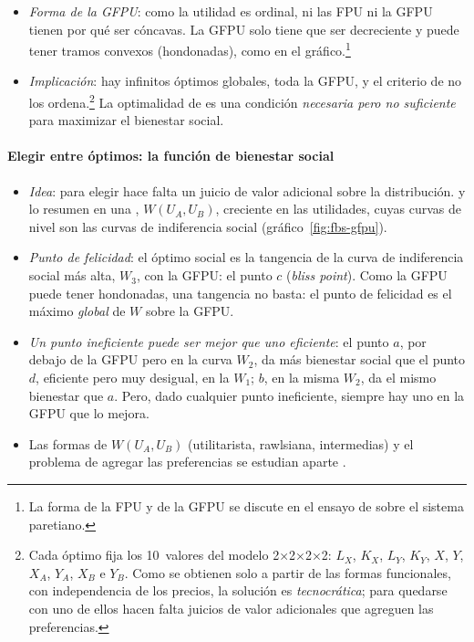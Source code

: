 \documentclass[11pt]{article}
\begin{document}
\begin{itemize}
\item \emph{Forma de la GFPU}: como la utilidad es ordinal, ni las FPU ni la GFPU tienen por qué ser cóncavas. La GFPU solo tiene que ser decreciente y puede tener tramos convexos (hondonadas), como en el gráfico.\footnote{La forma de la FPU y de la GFPU se discute en el ensayo de  sobre el sistema paretiano\nocite{HETParetoContents}.}
\end{itemize}

\begin{itemize}
\item \emph{Implicación}: hay infinitos óptimos globales, toda la GFPU, y el criterio de  no los ordena.\footnote{Cada óptimo fija los 10~valores del modelo 2×2×2×2: $L_X$, $K_X$, $L_Y$, $K_Y$, $X$, $Y$, $X_A$, $Y_A$, $X_B$ e $Y_B$. Como se obtienen solo a partir de las formas funcionales, con independencia de los precios, la solución es \emph{tecnocrática}; para quedarse con uno de ellos hacen falta juicios de valor adicionales que agreguen las preferencias.} La optimalidad de  es una condición \emph{necesaria pero no suficiente} para maximizar el bienestar social.
\end{itemize}

\paragraph{Elegir entre óptimos: la función de bienestar social}

\begin{itemize}
\item \emph{Idea}: para elegir hace falta un juicio de valor adicional sobre la distribución. \textcite{Bergson1938Reformulation} y \textcite{Samuelson1947Foundations} lo resumen en una , $W(U_A,U_B)$, creciente en las utilidades, cuyas curvas de nivel son las curvas de indiferencia social (gráfico~\ref{fig:fbs-gfpu}).
\item \emph{Punto de felicidad}: el óptimo social es la tangencia de la curva de indiferencia social más alta, $W_3$, con la GFPU: el punto $c$ (\emph{bliss point}). Como la GFPU puede tener hondonadas, una tangencia no basta: el punto de felicidad es el máximo \emph{global} de $W$ sobre la GFPU.
\item \emph{Un punto ineficiente puede ser mejor que uno eficiente}: el punto $a$, por debajo de la GFPU pero en la curva $W_2$, da más bienestar social que el punto $d$, eficiente pero muy desigual, en la $W_1$; $b$, en la misma $W_2$, da el mismo bienestar que $a$. Pero, dado cualquier punto ineficiente, siempre hay uno en la GFPU que lo mejora.
\item Las formas de $W(U_A,U_B)$ (utilitarista, rawlsiana, intermedias) y el problema de agregar las preferencias se estudian aparte .
\end{itemize}
\end{document}
